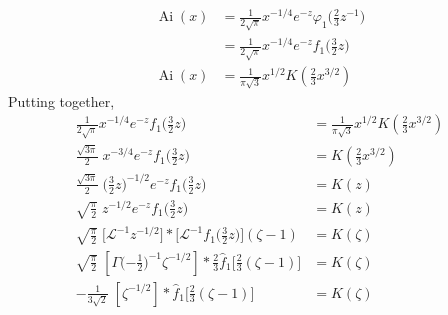 \documentclass{article}
\theoremstyle{definition}
\theoremstyle{plain}
\newcommand{\laplace}{\mathcal{L}}
\DeclareMathOperator{\Ai}{Ai}
\begin{document}
\begin{align*}
\Ai(x) & = \tfrac{1}{2\sqrt{\pi}} x^{-1/4} e^{-z} \varphi_1\big(\tfrac{2}{3} z^{-1}\big) \\
& = \tfrac{1}{2\sqrt{\pi}} x^{-1/4} e^{-z} f_1\big(\tfrac{3}{2} z\big) \\
\Ai(x) & = \frac{1}{\pi\sqrt{3}} x^{1/2} K(\tfrac{2}{3} x^{3/2})
\end{align*}
Putting together,
\begin{align*}
\tfrac{1}{2\sqrt{\pi}} x^{-1/4} e^{-z} f_1\big(\tfrac{3}{2} z\big) & = \frac{1}{\pi\sqrt{3}} x^{1/2} K(\tfrac{2}{3} x^{3/2}) \\
\tfrac{\sqrt{3\pi}}{2}\;x^{-3/4} e^{-z} f_1\big(\tfrac{3}{2} z\big) & = K(\tfrac{2}{3} x^{3/2}) \\
\tfrac{\sqrt{3\pi}}{2}\;\big(\tfrac{3}{2} z)^{-1/2} e^{-z} f_1\big(\tfrac{3}{2} z\big) & = K(z) \\
\sqrt{\tfrac{\pi}{2}}\;z^{-1/2} e^{-z} f_1\big(\tfrac{3}{2} z\big) & = K(z) \\
\sqrt{\tfrac{\pi}{2}}\;\big[\laplace^{-1} z^{-1/2}\big] * \big[\laplace^{-1} f_1\big(\tfrac{3}{2} z\big)\big](\zeta - 1) & = \hat{K}(\zeta) \\
\sqrt{\tfrac{\pi}{2}}\;\left[\Gamma\big({-\tfrac{1}{2}}\big)^{-1} \zeta^{-1/2}\right] * \tfrac{2}{3} \hat{f}_1\big[\tfrac{2}{3}(\zeta - 1)\big] & = \hat{K}(\zeta) \\
-\tfrac{1}{3\sqrt{2}}\;\left[\zeta^{-1/2}\right] * \hat{f}_1\big[\tfrac{2}{3}(\zeta - 1)\big] & = \hat{K}(\zeta) \\
\end{align*}



\end{document}
